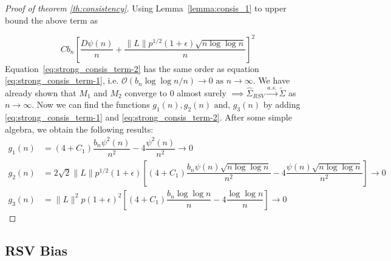\documentclass[11pt]{article}
\theoremstyle{remark}
\begin{document}
\begin{proof}[Proof of theorem \ref{th:consistency}]
Using Lemma~\ref{lemma:consis_1} to upper bound the above term as 

\begin{equation} \label{eq:strong_consis_term-2}
     Cb_n\left[ \dfrac{D \psi(n)}{n} + \dfrac{\|L\| p^{1/2}(1+\epsilon)\sqrt{n \log\log n}}{n}  \right]^2
\end{equation}
%
Equation~\eqref{eq:strong_consis_term-2} has the same order as equation \eqref{eq:strong_consis_term-1}, i.e. $\mathcal{O}\left(b_n \log \log n/n\right) \to 0 \textrm{ as } n \to \infty$.
We have already shown that $M_1$ and $M_2$ converge to 0 almost surely $\implies \hat{\Sigma}_{RSV} \xrightarrow{a.s.} \tilde{\Sigma}$ as $n \to \infty$. Now we can find the functions $g_1(n), g_2(n) \textrm{ and, } g_3(n)$ by adding \eqref{eq:strong_consis_term-1} and \eqref{eq:strong_consis_term-2}. After some simple algebra, we obtain the following results:
%
\begin{align*}
    g_1(n) &= (4+C_1)\dfrac{b_n \psi^2(n)}{n^2} - 4\dfrac{\psi^2(n)}{n^2} \to 0\\
    g_2(n) &= 2\sqrt{2}\|L\|p^{1/2}(1+\epsilon)\left[(4+C_1)\dfrac{b_n\psi(n)\sqrt{n\log \log n}}{n^2} - 4\dfrac{\psi(n)\sqrt{n\log \log n}}{n^2}\right] \to 0\\
    g_3(n) &= \|L\|^2 p (1+\epsilon)^2\left[(4+C_1)\dfrac{b_n \log\log n}{n} - 4 \dfrac{\log \log n}{n}\right] \to 0
\end{align*}
\end{proof}




\subsection{RSV Bias}
\end{document}
